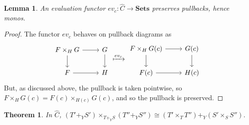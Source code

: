 \documentclass[12pt]{article}
\newcommand{\from}{\colon}
\renewcommand{\(}{\left(}
\renewcommand{\)}{\right)}
\renewcommand{\{}{\left\lbrace}
\renewcommand{\}}{\right\rbrace}
\newtheorem*{thm}{Theorem}
\newtheorem*{lem}{Lemma}
\theoremstyle{remark}
\theoremstyle{definition}
\begin{document}
\begin{lem}
	An evaluation functor $ev_c \from \widehat{C} \to \mathbf{Sets}$ preserves pullbacks, hence monos.  
\end{lem}
\begin{proof}
	The functor $ev_c$ behaves on pullback diagrams as
	\[
		\begin{tikzcd}
			{F \times_H G} 
				\ar[r] \ar[d] &
			{G} 
				\ar[d] \\
			{F} 
				\ar[r] &
			{H}
		\end{tikzcd}
		\xmapsto{ev_c}
		\begin{tikzcd}
			{F \times_H G (c)} 
				\ar[r] \ar[d] &
			{G(c)} 
				\ar[d] \\
			{F(c)} 
				\ar[r] &
			{H(c)}
		\end{tikzcd}
	\]
	But, as discussed above, the pullback is taken pointwise, so $F \times_H G (c) = F(c) \times_{H(c)} G (c)$, and so the pullback is preserved.
\end{proof}

\begin{thm}
	In $\widehat{C}$, $(T' +_Y S') \times_{T +_Y S} (T''+_Y S'') \cong (T' \times_{T} T'') +_{Y} (S' \times_{S} S'')$.
\end{thm}
\end{document}
